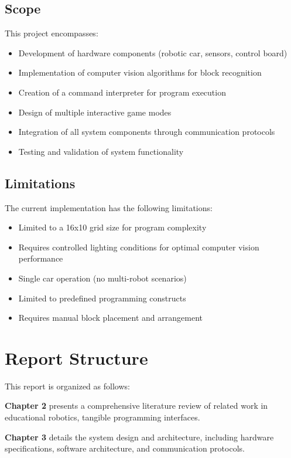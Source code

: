 \subsection{Scope}
This project encompasses:
\begin{itemize}
    \item Development of hardware components (robotic car, sensors, control board)
    \item Implementation of computer vision algorithms for block recognition
    \item Creation of a command interpreter for program execution
    \item Design of multiple interactive game modes
    \item Integration of all system components through communication protocols
    \item Testing and validation of system functionality
\end{itemize}

\subsection{Limitations}
The current implementation has the following limitations:
\begin{itemize}
    \item Limited to a 16x10 grid size for program complexity
    \item Requires controlled lighting conditions for optimal computer vision performance
    \item Single car operation (no multi-robot scenarios)
    \item Limited to predefined programming constructs
    \item Requires manual block placement and arrangement
\end{itemize}

\section{Report Structure}

This report is organized as follows:

\textbf{Chapter 2} presents a comprehensive literature review of related work in educational robotics, tangible programming interfaces.

\textbf{Chapter 3} details the system design and architecture, including hardware specifications, software architecture, and communication protocols.

